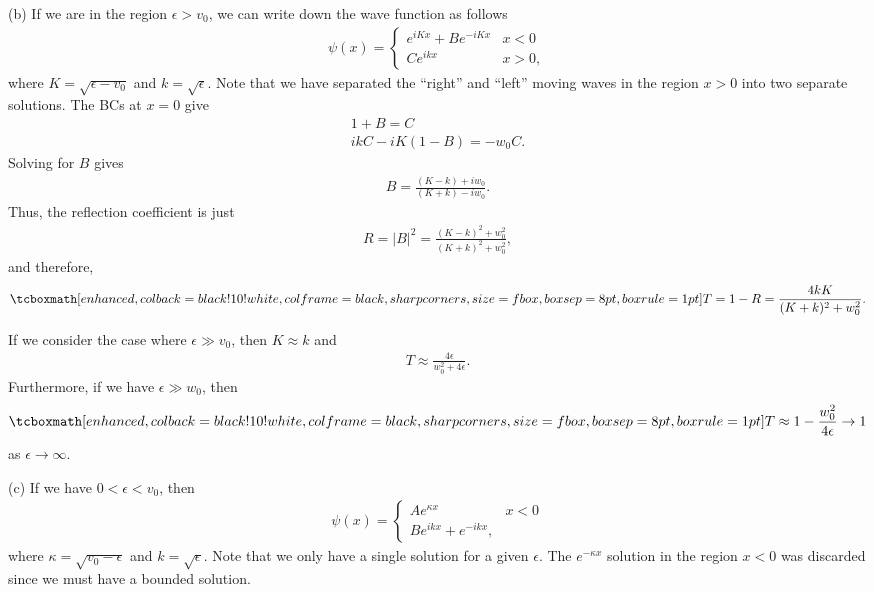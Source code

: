 {(b) If we are in the region $\epsilon > v_0$, we can write down the wave function as follows
\begin{eqnarray}
    \psi(x) = \begin{cases}
        e^{i K x} + Be^{-iKx} & x < 0 \\
        C e^{ikx} & x > 0
    ,\end{cases}
\end{eqnarray}
where $K = \sqrt{\epsilon - v_0}$ and $k = \sqrt{\epsilon}$.
Note that we have separated the ``right'' and ``left'' moving waves in the region $x > 0$ into two separate solutions.
The BCs at $x = 0$ give
\begin{gather}
   1 + B = C \\
    ik C - iK (1 - B) = -w_0 C
.\end{gather}
Solving for $B$ gives
\begin{eqnarray}
    B = \frac{(K - k) + iw_0}{(K+k) - iw_0}
.\end{eqnarray}
Thus, the reflection coefficient is just
\begin{eqnarray}
    R = |B|^2 = \frac{(K-k)^2 + w_0^2}{(K+k)^2 + w_0^2}
,\end{eqnarray}
and therefore,
\begin{eqnarray}
    \eqbox{ T = 1 - R = \frac{4 k K}{(K + k)^2 + w_0^2} }
.\end{eqnarray}

If we consider the case where $\epsilon \gg v_0$, then $K \approx k$ and
\begin{eqnarray}
    T \approx \frac{4 \epsilon}{w_0^2 + 4 \epsilon}
.\end{eqnarray}
Furthermore, if we have $\epsilon \gg w_0$, then
\begin{eqnarray}
    \eqbox{ T \approx 1 - \frac{w_0^2}{4 \epsilon} \rightarrow 1 }
\end{eqnarray}
as $\epsilon \rightarrow \infty$.

(c) If we have $0 < \epsilon < v_0$, then
\begin{eqnarray}
    \psi(x) = \begin{cases}
        A e^{\kappa x} & x < 0 \\
        B e^{ikx} + e^{-ikx}
    ,\end{cases}
\end{eqnarray}
where $\kappa = \sqrt{v_0 - \epsilon}$ and $k = \sqrt{\epsilon}$.
Note that we only have a single solution for a given $\epsilon$.
The $e^{-\kappa x}$ solution in the region $x < 0$ was discarded since we must have a bounded solution.

}
